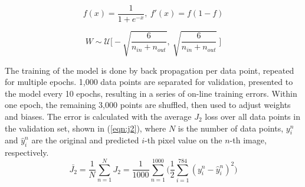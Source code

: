 \documentclass[11pt,titlepage]{article}
\begin{document}
\begin{equation}
	f(x) = \frac{1}{1+e^{-x}}, \  f'(x) = f(1-f)
	\label{eqn:sigmoid}
\end{equation}

\begin{equation}
	W \sim \mathcal{U} \bigg[  -\sqrt{\frac{6}{n_{in}+n_{out}}} , \  \sqrt{\frac{6}{n_{in}+n_{out}}} \ \bigg]
	\label{eqn:xavier}
\end{equation}

The training of the model is done by back propagation per data point, repeated for multiple epochs. 1,000 data points are separated for validation, presented to the model every 10 epochs, resulting in a series of on-line training errors. Within one epoch, the remaining 3,000 points are shuffled, then used to adjust weights and biases. The error is calculated with the average $J_2$ loss over all data points in the validation set, shown in (\ref{eqn:j2}), where $N$ is the number of data points, $y_i^n$ and $\hat{y}_i^n$ are the original and predicted $i$-th pixel value on the $n$-th image, respectively. 
\begin{equation}
	\bar{J_2} = \frac{1}{N} \sum_{n=1}^{N} J_2 = \frac{1}{1000} \sum_{n=1}^{1000} \bigg( \frac{1}{2} \sum_{i=1}^{784} (y_i^n - \hat{y}_i^n)^2 \bigg)
	\label{eqn:j2}
\end{equation}
\end{document}
